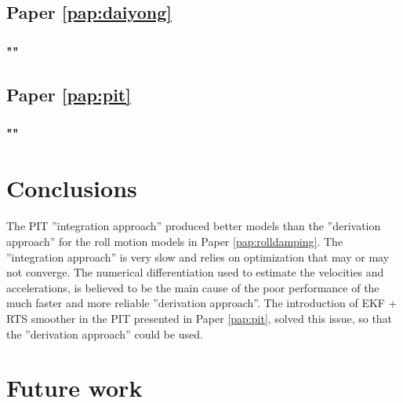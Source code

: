 \section{Paper \ref{pap:daiyong}}
\subsection*{""}

\section{Paper \ref{pap:pit}}
\subsection*{""}

\chapter{Conclusions\label{ch:conclusions}}
The PIT ''integration approach'' produced better models than the ''derivation approach'' for the roll motion models in Paper \ref{pap:rolldamping}. The ''integration approach'' is very slow and relies on optimization that may or may not converge.
The numerical differentiation used to estimate the velocities and accelerations, is believed to be the main cause of the poor performance of the much faster and more reliable ''derivation approach''. The introduction of EKF + RTS smoother in the PIT presented in Paper \ref{pap:pit}, solved this issue, so that the ''derivation approach'' could be used.  


\chapter{Future work\label{ch:future_work}}
